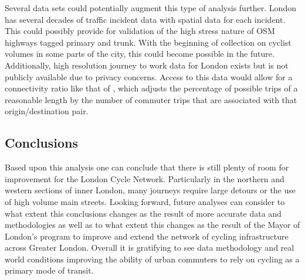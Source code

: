 Several data sets could potentially augment this type of analysis further. London has several decades of traffic incident data with spatial data for each incident. This could possibly provide for validation of the high stress nature of OSM highways tagged primary and trunk. With the beginning of collection on cyclist volumes in some parts of the city, this could become possible in the future.  Additionally, high resolution journey to work data for London exists but is not publicly available due to privacy concerns. Access to this data would allow for a connectivity ratio like that of \textcite{furth2016network}, which adjusts the percentage of possible trips of a reasonable length by the number of commuter trips that are associated with that origin/destination pair.

\subsection{Conclusions}

Based upon this analysis one can conclude that there is still plenty of room for improvement for the London Cycle Network. Particularly in the northern and western sections of inner London, many journeys require large detours or the use of high volume main streets. Looking forward, future analyses can consider to what extent this conclusions changes as the result of more accurate data and methodologies as well as to what extent this changes as the result of the Mayor of London's program to improve and extend the network of cycling infrastructure across Greater London. Overall it is gratifying to see data methodology and real world conditions improving the ability of urban commuters to rely on cycling as a primary mode of transit. 

 